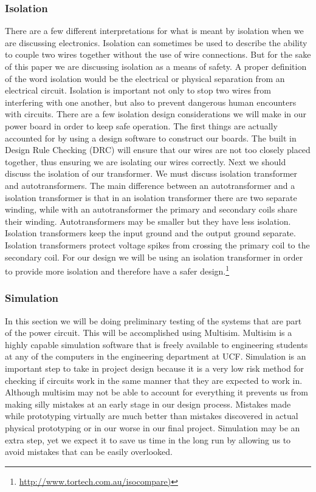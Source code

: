 \subsubsection{Isolation}
There are a few different interpretations for what is meant by isolation when
we are discussing electronics. Isolation can sometimes be used to describe the
ability to couple two wires together without the use of wire connections. But
for the sake of this paper we are discussing isolation as a means of safety. A
proper definition of the word isolation would be the electrical or physical
separation from an electrical circuit. Isolation is important not only to stop
two wires from interfering with one another, but also to prevent dangerous
human encounters with circuits. There are a few isolation design considerations
we will make in our power board in order to keep safe operation. The first
things are actually accounted for by using a design software to construct our
boards. The built in Design Rule Checking (DRC) will ensure that our wires are
not too closely placed together, thus ensuring we are isolating our wires
correctly. Next we should discuss the isolation of our transformer. We must
discuss isolation transformer and  autotransformers. The main difference
between an autotransformer and a isolation transformer is that in an isolation
transformer there are two separate winding, while with an autotransformer the
primary and secondary coils share their winding. Autotransformers may be
smaller but they have less isolation. Isolation transformers keep the input
ground and the output ground separate. Isolation transformers protect voltage
spikes from crossing the primary coil to the secondary coil. For our design we
will be using an isolation transformer in order to provide more isolation and
therefore have a safer
design.\footnote{\url{http://www.tortech.com.au/isocompare)}}


\subsubsection{Simulation}
In this section we will be doing preliminary testing of the systems that are
part of the power circuit. This will be accomplished using Multisim. Multisim
is a highly capable simulation software that is freely available to engineering
students at any of the computers in the engineering department at UCF.
Simulation is an important step to take in project design because it is a very
low risk method for checking if circuits work in the same manner that they are
expected to work in. Although multisim may not be able to account for
everything it prevents us from making silly mistakes at an early stage in our
design process. Mistakes made while prototyping virtually are much better than
mistakes discovered in actual physical prototyping or in our worse in our final
project. Simulation may be an extra step, yet we expect it to save us time in
the long run by allowing us to avoid mistakes that can be easily overlooked.

